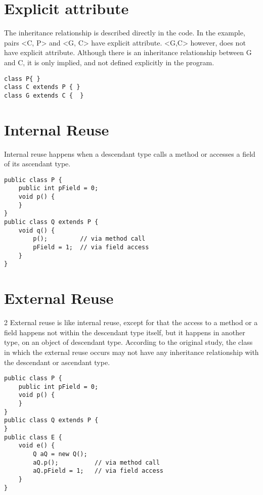 \documentclass{uvamscse}
\begin{document}
\section{Explicit attribute}
\begin{multicols}{2}
The inheritance relationship is described directly in the code. In the example, pairs <C, P> and <G, C> have explicit attribute. <G,C> however, does not have explicit attribute. Although there is an inheritance relationship between G and C, it is only implied, and not defined explicitly in the program.
\columnbreak
\begin{verbatim}
class P{ }
class C extends P { } 
class G extends C {  } 
\end{verbatim}
\end{multicols}




\section{Internal Reuse}
\begin{multicols}{2}
Internal reuse happens when a descendant type calls a method or accesses a field of its ascendant type. 
\columnbreak
\begin{verbatim}
public class P {
    public int pField = 0;
    void p() {
    }
}
public class Q extends P {
    void q() {
        p();         // via method call
        pField = 1;  // via field access
    }
}
\end{verbatim}
\end{multicols}



\section{External Reuse}
\begin{multicols} {2}
External reuse is like internal reuse, except for that the access to a method or a field happens not within the descendant type itself, but it happens in another type, on an object of descendant type. According to the original study, the class in which the external reuse occurs may not have any inheritance relationship with the descendant or ascendant type.
\columnbreak
\begin{verbatim}
public class P {
    public int pField = 0;
    void p() {
    }
}
public class Q extends P {
}
public class E {
    void e() {
        Q aQ = new Q();
        aQ.p();          // via method call
        aQ.pField = 1;   // via field access
    }
}
\end{verbatim}
\end{multicols}
\end{document}
